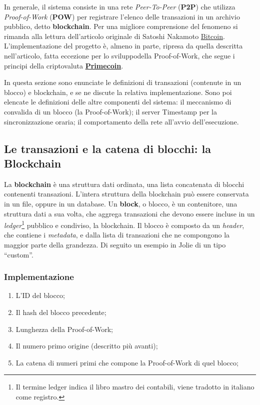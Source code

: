 In generale, il sistema consiste in una rete \textit{Peer-To-Peer} (\textbf{P2P}) che utilizza \textit{Proof-of-Work} (\textbf{POW}) per registrare l'elenco delle transazioni in un archivio pubblico, detto \textbf{blockchain}. Per una migliore comprensione del fenomeno si rimanda alla lettura dell'articolo originale di Satoshi Nakamoto \href{https://bitcoin.org/bitcoin.pdf}{Bitcoin}. 
L'implementazione del progetto è, almeno in parte, ripresa da quella descritta nell'articolo, fatta eccezione per lo sviluppodella Proof-of-Work, che segue i principi della criptovaluta \href{http://primecoin.io/bin/primecoin-paper.pdf}{\textbf{Primecoin}}.

In questa sezione sono enunciate le definizioni di transazioni (contenute in un blocco) e blockchain, e se ne discute la relativa implementazione. Sono poi elencate le definizioni delle altre componenti del sistema: il meccanismo di convalida di un blocco (la Proof-of-Work); il server Timestamp per la sincronizzazione oraria; il comportamento della rete all'avvio dell'esecuzione.

\subsection{Le transazioni e la catena di blocchi: la Blockchain}
La \textbf{blockchain} è una struttura dati ordinata, una lista concatenata di blocchi contenenti transazioni. L'intera struttura della blockchain può essere conservata in un file, oppure in un database. Un \textbf{block}, o blocco, è un contenitore, una struttura dati a sua volta, che aggrega transazioni che devono essere incluse in un \textit{ledger}\footnote{Il termine ledger indica il libro mastro dei contabili, viene tradotto in italiano come registro.} pubblico e condiviso, la blockchain. 
Il blocco è composto da un \textit{header}, che contiene i \textit{metadata}, e dalla lista di transazioni che ne compongono la maggior parte della grandezza. Di seguito un esempio in Jolie di un tipo ``custom''.

\subsubsection{Implementazione}
\begin{enumerate}
    \item L'ID del blocco;
    \item Il hash del blocco precedente;
    \item Lunghezza della Proof-of-Work;
    \item Il numero primo origine (descritto più avanti);
    \item La catena di numeri primi che compone la Proof-of-Work di quel blocco;
\end{enumerate}

